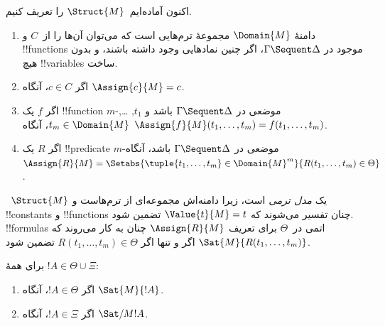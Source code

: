 \documentclass[../../../include/open-logic-section]{subfiles}
\begin{document}
اکنون آماده‌ایم~$\Struct{M}$ را تعریف کنیم.
\begin{enumerate}
\item دامنهٔ $\Domain{M}$ مجموعهٔ ترم‌هایی است که می‌توان آن‌ها را
از~$C$ و !!{function}s موجود در $\Gamma \Sequent \Delta$، اگر چنین
نمادهایی وجود داشته باشند، و بدون هیچ !!{variable}s ساخت.
\item اگر $c \in C$، آنگاه $\Assign{c}{M} = c$.
\item اگر $f$ یک !!{function} $m$-موضعی در
$\Gamma \Sequent \Delta$ باشد و
$t_1$, \dots, $t_m \in \Domain{M}$، آنگاه
$\Assign{f}{M}(t_1, \dots, t_m) = f(t_1, \dots, t_m)$.
\item اگر $R$ یک !!{predicate} $m$-موضعی در
$\Gamma \Sequent \Delta$ باشد، آنگاه
$\Assign{R}{M} = \Setabs{\tuple{t_1, \dots, t_m} \in
\Domain{M}^m}{R(t_1, \dots, t_m) \in \Theta}$.
\end{enumerate}
~‌$\Struct{M}$ یک \emph{مدل ترمی} است، زیرا دامنه‌اش مجموعه‌ای از
ترم‌هاست و !!{constant}s و !!{function}s چنان تفسیر می‌شوند که
$\Value{t}{M} = t$ تضمین شود. !!{formula}s اتمی در~$\Theta$ برای
تعریف $\Assign{R}{M}$ چنان به کار می‌روند که
$\Sat{M}{R(t_1, \dots, t_m)}$ اگر و تنها اگر
$R(t_1, \dots, t_m) \in \Theta$ تضمین شود.

\begin{lem}
برای همهٔ $!A \in \Theta \cup \Xi$:
\begin{enumerate}
  \item اگر $!A \in \Theta$، آنگاه $\Sat{M}{!A}$.
  \item اگر $!A \in \Xi$، آنگاه $\Sat/{M}{!A}$.
\end{enumerate}
\end{lem}
\end{document}
